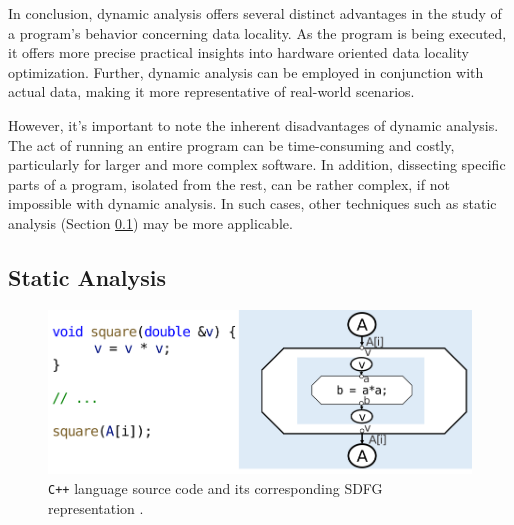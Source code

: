 In conclusion, dynamic analysis offers several distinct advantages in the study of a program's behavior concerning data locality. As the program is being executed, it offers more precise practical insights into hardware oriented data locality optimization. Further, dynamic analysis can be employed in conjunction with actual data, making it more representative of real-world scenarios.

However, it's important to note the inherent disadvantages of dynamic analysis. The act of running an entire program can be time-consuming and costly, particularly for larger and more complex software. In addition, dissecting specific parts of a program, isolated from the rest, can be rather complex, if not impossible with dynamic analysis. In such cases, other techniques such as static analysis (Section \ref{sec:static_analysis}) may be more applicable.

\subsection{Static Analysis}\label{sec:static_analysis}
\begin{figure}
  \centering
  \includegraphics[width=\linewidth]{pictures/SDFG.png}
  \caption{\texttt{C++} language source code and its corresponding SDFG representation \cite{calotoiu2022lifting}.}
  \label{fig:sdfg}
\end{figure}

